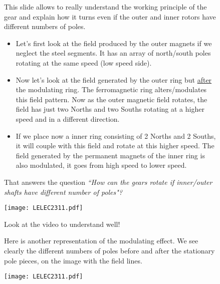 \begin{figure}[H]
    \begin{minipage}{.45\linewidth}
        
       This slide allows to really understand the working principle of the gear and explain how it turns even if the outer and inner rotors have different numbers of poles. 
       
       
       \begin{itemize}
           \item Let’s first look at the field produced by the outer magnets if we neglect the steel segments. It has an array of north/south poles rotating at the same speed (low speed side). 
           \item Now let’s look at the field generated by the outer ring but \underline{after} the modulating ring. The ferromagnetic ring alters/modulates this field pattern. Now as the outer magnetic field rotates, the field has just two Norths and two Souths rotating at a higher speed and in a different direction.
           \item If we place now a inner ring consisting of 2 Norths and 2 Souths, it will couple with this field and rotate at this higher speed. The field generated by the permanent magnets of the inner ring is also modulated, it goes from high speed to lower speed.
       \end{itemize}
       
       That answers the question \textit{“How can the gears rotate if inner/outer shafts have different number of poles"?}


    \end{minipage}
    \hfill%
    \begin{minipage}[c]{.45\linewidth}
        \centering
        \texttt{[image: LELEC2311.pdf]}
        \caption{Look at the video to understand well!}
    \end{minipage}
\end{figure}


\begin{figure}[H]
    \begin{minipage}{.45\linewidth}
        
       Here is another representation of the modulating effect. We see clearly the different numbers of poles before and after the stationary pole pieces, on the image with the field lines. 



    \end{minipage}
    \hfill%
    \begin{minipage}[c]{.45\linewidth}
        \centering
        \texttt{[image: LELEC2311.pdf]}
    \end{minipage}
\end{figure}

